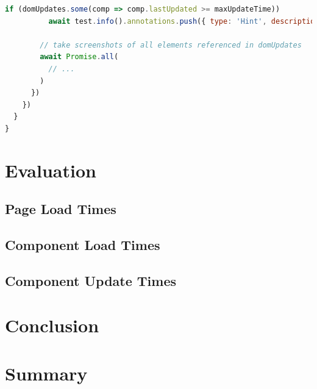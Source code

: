 \documentclass[a4paper, 10pt]{article}
\begin{document}
\begin{lstlisting}[caption={Test file for component update times}, label={lst:state-change-spec}, language=JavaScript]
        if (domUpdates.some(comp => comp.lastUpdated >= maxUpdateTime))
          await test.info().annotations.push({ type: 'Hint', description: `Screenshots below show slow updating components` });

        // take screenshots of all elements referenced in domUpdates
        await Promise.all(
          // ...
        )
      })
    })
  }
}
\end{lstlisting}
  
\section{Evaluation}\label{sec:evaluation}
\subsection{Page Load Times}\label{subsec:pageloadtimes}

\subsection{Component Load Times}\label{subsec:componentloadtimes}

\subsection{Component Update Times}\label{subsec:componentupdatetimes}

\section{Conclusion}\label{sec:conclusion}

\section{Summary}\label{sec:summary}
\end{document}
